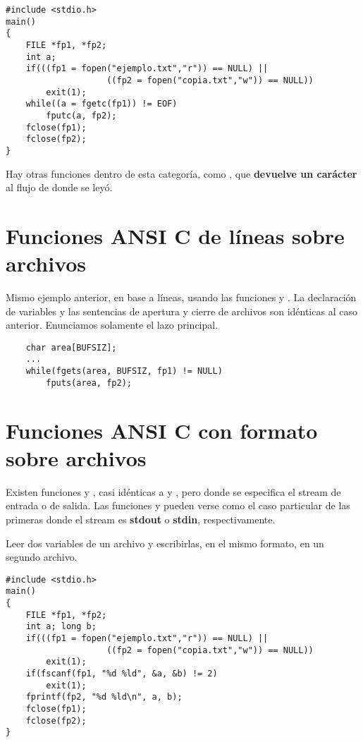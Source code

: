 \begin{lstlisting}
#include <stdio.h>
main()
{
    FILE *fp1, *fp2;
    int a;
    if(((fp1 = fopen("ejemplo.txt","r")) == NULL) ||
                    ((fp2 = fopen("copia.txt","w")) == NULL))
        exit(1);
    while((a = fgetc(fp1)) != EOF)
        fputc(a, fp2);
    fclose(fp1);
    fclose(fp2);
}
\end{lstlisting}

Hay otras funciones dentro de esta categoría, como , que \textbf{devuelve un
carácter} al flujo de donde se leyó.

\section{Funciones ANSI C de líneas sobre archivos}
\label{subsubsec:esarchivosansiclineas}
Mismo ejemplo anterior, en base a líneas, usando las funciones  y . La
declaración de variables  y las sentencias de apertura y cierre de
archivos son idénticas al caso anterior. Enunciamos solamente el lazo
principal.
    
\begin{lstlisting}
    char area[BUFSIZ];
    ...
    while(fgets(area, BUFSIZ, fp1) != NULL)
        fputs(area, fp2);
\end{lstlisting}

\section{Funciones ANSI C con formato sobre archivos}
\label{subsubsec:esarchivosansicformato}

Existen funciones  y , casi idénticas a  y ,
pero donde se especifica el stream de entrada o de salida. Las funciones  y  pueden verse como el caso particular de las primeras donde el
stream es \textbf{stdout} o \textbf{stdin}, respectivamente.

\begin{ejemplo}
Leer dos variables de un archivo y escribirlas, en el
mismo formato, en un segundo archivo.
\begin{lstlisting}
#include <stdio.h>
main()
{
    FILE *fp1, *fp2;
    int a; long b;
    if(((fp1 = fopen("ejemplo.txt","r")) == NULL) ||
                    ((fp2 = fopen("copia.txt","w")) == NULL))
        exit(1);
    if(fscanf(fp1, "%d %ld", &a, &b) != 2)
        exit(1);
    fprintf(fp2, "%d %ld\n", a, b);
    fclose(fp1);
    fclose(fp2);
}
\end{lstlisting}
\end{ejemplo}



